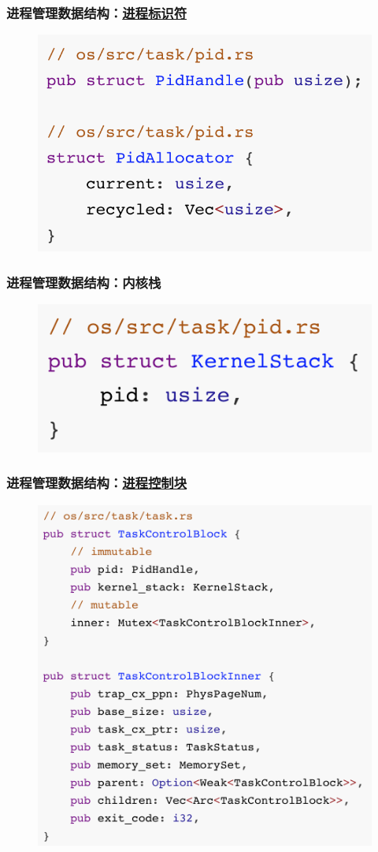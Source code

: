 \begin{frame}[fragile]
    \frametitle{进程管理数据结构：\href{https://rcore-os.github.io/rCore-Tutorial-Book-v3/chapter5/2core-data-structures.html\#id6}{进程标识符}}
% 
	\begin{figure}
		\centering
		\includegraphics[width=0.6\linewidth]{figs/pid.png}
	\end{figure}


% 
\end{frame}
\begin{frame}[fragile]
    \frametitle{进程管理数据结构：内核栈}
% 
	\begin{figure}
		\centering
		\includegraphics[width=0.5\linewidth]{figs/kernelstack.png}
	\end{figure}



% 
\end{frame}
\begin{frame}[fragile]
    \frametitle{进程管理数据结构：\href{https://rcore-os.github.io/rCore-Tutorial-Book-v3/chapter5/2core-data-structures.html\#id7}{进程控制块}}
% 
	\begin{figure}
		\centering
		\includegraphics[width=0.45\linewidth]{figs/PCB.png}
	\end{figure}



% 
\end{frame}
